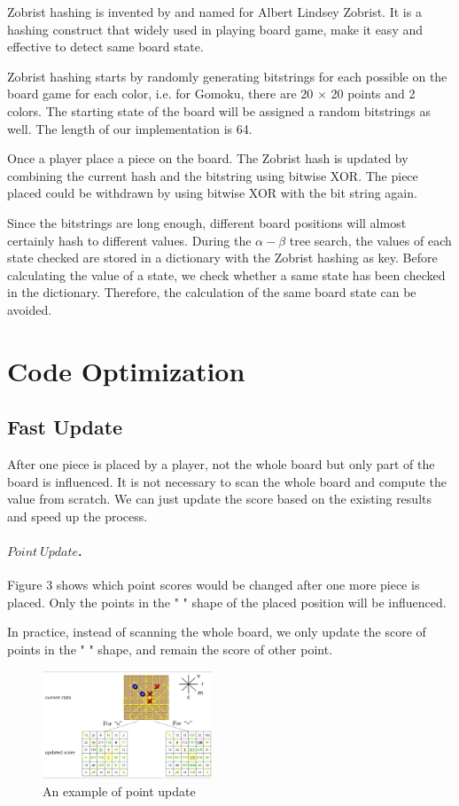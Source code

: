 \documentclass[final]{cvpr}
\newcommand{\mypara}[1]{\paragraph{#1.}}
\begin{document}
Zobrist hashing is invented by and named for Albert Lindsey Zobrist. 
%
It is a hashing construct that widely used in playing board game,
make it easy and effective to detect same board state.
%

Zobrist hashing starts by randomly generating bitstrings for each possible on the board game for each color, 
i.e. for Gomoku, there are 20 $\times$ 20 points and 2 colors.
%
The starting state of the board will be assigned a random bitstrings as well.
%
The length of our implementation is 64.
%

Once a player place a piece on the board. The Zobrist hash is updated by combining the current hash and the bitstring using bitwise XOR. The piece placed could be withdrawn by using bitwise XOR with the bit string again.
%

Since the bitstrings are long enough, different board positions will almost certainly hash to different values.
%
During the $\alpha-\beta$ tree search, 
the values of each state checked are stored in a dictionary with the Zobrist hashing as key.
%
Before calculating the value of a state, we check whether a same state has been checked in the dictionary.
%
Therefore, the calculation of the same board state can be avoided.

\section{Code Optimization}
\subsection{Fast Update}
%
After one piece is placed by a player, 
not the whole board but only part of the board is influenced.
%
It is not necessary to scan the whole board and compute the value from scratch.
%
We can just update the score based on the existing results 
and speed up the process.
%

\mypara{$Point\ Update$}
%
Figure 3 shows which point scores would be changed after one more piece is placed. 
%
Only the points in the 
" {\ooalign{$\times$\cr\hidewidth$+$\hidewidth\cr}} "
shape of the placed position will be influenced.

%
In practice, instead of scanning the whole board,
we only update the score of points in the "
{\ooalign{$\times$\cr\hidewidth$+$\hidewidth\cr}} "
shape, and remain the score of other point.

\begin{figure}[htbp]
\centering 
\includegraphics[width=0.45\textwidth]{figures/pic3.png} 
\caption{An example of point update} 
\label{Fig.main5} %
\end{figure}
\end{document}
